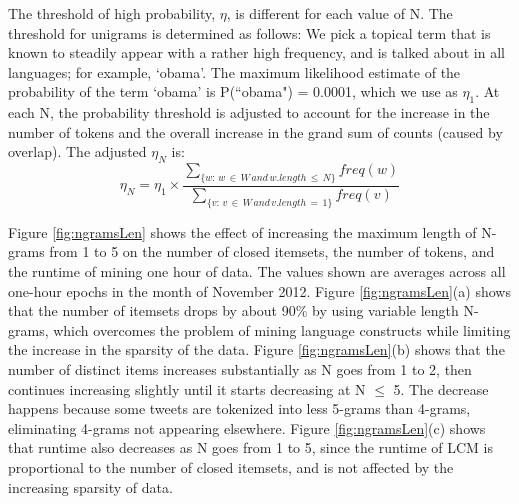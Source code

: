 \documentclass{sig-alternate}
\begin{document}
The threshold of high probability, $\eta$, is different for each value of N. 
The threshold for unigrams is determined as follows: 
We pick a topical term that is known to  steadily  appear with a rather high frequency, 
and is talked about in all languages; for example, `obama'. 
The maximum likelihood estimate of the probability of the term `obama' 
is P(``obama") = 0.0001, which we use as $\eta_1$.
At each N, the probability threshold is adjusted to account for the increase
in the number of tokens and the overall increase in the grand sum of counts (caused by overlap).
The adjusted $\eta_N$ is:
\begin{equation}\eta_N = \eta_1 \times \frac{\sum_{\{w:\, w \,\in\, W\, and\, w.length \,\le\, N\}}{freq(w)}}{\sum_{\{v:\, v\, \in\, W \,and \,v.length\,=\,1\}}{freq(v)}}\end{equation}


Figure \ref{fig:ngramsLen} shows the effect of increasing the maximum length
of N-grams from 1 to 5 on 
the number of closed itemsets,
the number of tokens, 
and the runtime of mining one hour of data.
The values shown are averages across all one-hour epochs in the month of
November 2012.
Figure \ref{fig:ngramsLen}(a) shows that the number of itemsets 
drops by about 90\% by using variable length N-grams,
which overcomes the problem of mining language constructs
while limiting the increase in the sparsity of the data.
Figure \ref{fig:ngramsLen}(b) shows that the number of distinct items
increases substantially as N goes from 1 to 2, then continues increasing
slightly until it starts decreasing at N $\le$ 5. %
The decrease happens because 
some tweets are tokenized into less 5-grams than 4-grams,
eliminating 4-grams not appearing elsewhere.
Figure \ref{fig:ngramsLen}(c) shows that runtime also decreases as N goes
from 1 to 5, since the runtime of LCM  is proportional to the number of closed
itemsets, %
and is not affected by the increasing sparsity of data.
\end{document}

